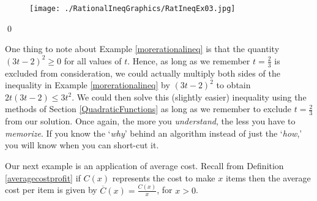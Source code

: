 \begin{ex}
\begin{figure}
\begin{center}
\caption{}
\label{fig:signdiagramtwotintothreetetc}
\end{center}
\end{figure}

\begin{figure}
\begin{center}

\texttt{[image: ./RationalIneqGraphics/RatIneqEx03.jpg]}

\caption{}
\label{fig:twotintothreetetc}
\end{center}
\end{figure}

\qed
\end{ex}

One thing to note about Example \ref{morerationalineq} is that the quantity $(3t-2)^2 \geq 0$ for all values of $t$.  Hence, as long as we remember $t = \frac{2}{3}$ is excluded from consideration, we could actually multiply both sides of the inequality in  Example \ref{morerationalineq} by $(3t-2)^2$ to obtain $2t(3t-2) \leq 3t^2$.  We could then solve this (slightly easier) inequality using the methods of Section \ref{QuadraticFunctions} as long as we remember to exclude $t = \frac{2}{3}$  from our solution. Once again, the more you \textit{understand}, the less you have to \textit{memorize}.  If you know the `\textit{why}' behind an algorithm instead of just the `\textit{how},' you will know when you can short-cut it.

Our next example is an application of average cost.  Recall from Definition \ref{averagecostprofit} if $C(x)$ represents the cost to make $x$ items then the average cost per item  is given by $\overline{C}(x) = \frac{C(x)}{x}$, for $x>0$. 

